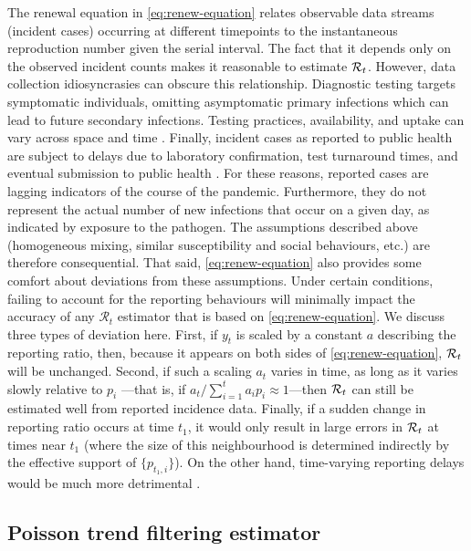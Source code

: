 The renewal equation in \eqref{eq:renew-equation} relates observable data
streams (incident cases) occurring at different timepoints to the instantaneous
reproduction number given the serial interval. The fact that it depends only on
the observed incident counts makes it reasonable to estimate $\mathcal{R}_t$. However,
data collection idiosyncrasies can obscure this relationship. Diagnostic testing
targets symptomatic individuals, omitting asymptomatic primary infections which
can lead to future secondary infections. Testing practices, availability, and
uptake can vary across space and time \citep{pitzer2021impact,
hitchings2021usefulness}. Finally, incident cases as reported to public health
are subject to delays due to laboratory confirmation, test turnaround times, and
eventual submission to public health \citep{pellis2021challenges}. For these
reasons, reported cases are lagging indicators of the course of the pandemic.
Furthermore, they do not represent the actual number of new infections that
occur on a given day, as indicated by exposure to the pathogen. The assumptions
described above (homogeneous mixing, similar susceptibility and social
behaviours, etc.) are therefore consequential. That said,
\eqref{eq:renew-equation} also provides some comfort about deviations from these
assumptions. Under certain conditions, failing to account for the reporting
behaviours will minimally impact the accuracy of any $\mathcal{R}_t$ estimator
that is based on \eqref{eq:renew-equation}. We discuss three types of deviation
here. First, if $y_t$ is scaled by a constant $a$ describing the reporting
ratio, then, because it appears on both sides of \eqref{eq:renew-equation},
$\mathcal{R}_t$ will be unchanged. Second, if such a scaling $a_t$ varies in time, as
long as it varies slowly relative to $p_i$ ---that is, if $a_t / \sum_{i = 1}^t
a_i p_i \approx 1$---then $\mathcal{R}_t$ can still be estimated well from reported
incidence data. Finally, if a sudden change in reporting ratio occurs at time
$t_1$, it would only result in large errors in $\mathcal{R}_t$ at times near $t_1$
(where the size of this neighbourhood is determined indirectly by the effective
support of $\{p_{t_1,i}\}$). On the other hand, time-varying reporting delays
would be much more detrimental \citep{EALES2024100742,park2024estimating}.


\subsection{Poisson trend filtering estimator} 

